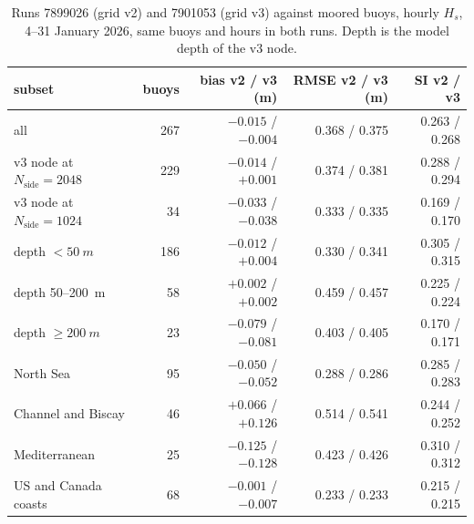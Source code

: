 \documentclass[11pt,a4paper]{article}
\newcommand{\nside}{N_{\mathrm{side}}}
\begin{document}
\begin{table}[H]
\centering\small
\begin{tabular}{lrrrr}
\toprule
subset & buoys & bias v2 / v3 (m) & RMSE v2 / v3 (m) & SI v2 / v3 \\
\midrule
all                     & 267 & $-0.015$ / $-0.004$ & 0.368 / 0.375 & 0.263 / 0.268 \\
v3 node at $\nside=2048$& 229 & $-0.014$ / $+0.001$ & 0.374 / 0.381 & 0.288 / 0.294 \\
v3 node at $\nside=1024$&  34 & $-0.033$ / $-0.038$ & 0.333 / 0.335 & 0.169 / 0.170 \\
depth $<\SI{50}{m}$     & 186 & $-0.012$ / $+0.004$ & 0.330 / 0.341 & 0.305 / 0.315 \\
depth 50--\SI{200}{m}   &  58 & $+0.002$ / $+0.002$ & 0.459 / 0.457 & 0.225 / 0.224 \\
depth $\ge\SI{200}{m}$  &  23 & $-0.079$ / $-0.081$ & 0.403 / 0.405 & 0.170 / 0.171 \\
North Sea               &  95 & $-0.050$ / $-0.052$ & 0.288 / 0.286 & 0.285 / 0.283 \\
Channel and Biscay      &  46 & $+0.066$ / $+0.126$ & 0.514 / 0.541 & 0.244 / 0.252 \\
Mediterranean           &  25 & $-0.125$ / $-0.128$ & 0.423 / 0.426 & 0.310 / 0.312 \\
US and Canada coasts    &  68 & $-0.001$ / $-0.007$ & 0.233 / 0.233 & 0.215 / 0.215 \\
\bottomrule
\end{tabular}
\caption{Runs 7899026 (grid v2) and 7901053 (grid v3) against moored
buoys, hourly $H_s$, 4--31 January 2026, same buoys and hours in both
runs. Depth is the model depth of the v3 node.}
\label{tab:buoys}
\end{table}
\end{document}
